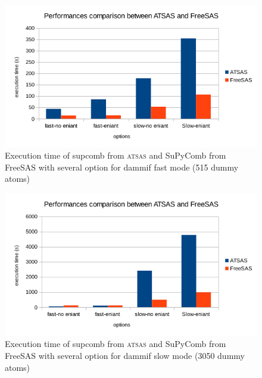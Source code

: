 \documentclass[a4paper, 11pt]{report}
\begin{document}
\begin{figure}
\includegraphics[scale=0.8]{perfdamfast.png}
\caption{Execution time of supcomb from \textsc{atsas} and SuPyComb 
  from FreeSAS with several option for dammif fast mode (515 dummy 
  atoms)}
\label{fgr:perfdamfast}
\end{figure} \vfill
\begin{figure}
\includegraphics[scale=0.8]{perfdamslow.png}
\caption{Execution time of supcomb from \textsc{atsas} and SuPyComb 
  from FreeSAS with several option for dammif slow mode (3050 dummy 
  atoms)}
\label{fgr:perfdamslow}
\end{figure}
\end{document}
